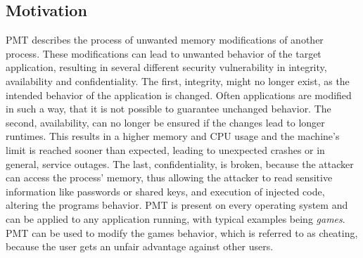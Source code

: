 \subsection{Motivation}
\gls{PMT} describes the process of unwanted memory modifications of another process. These modifications can lead to unwanted behavior of the target application, resulting in several different security vulnerability in integrity, availability and confidentiality. The first, integrity, might no longer exist, as the intended behavior of the application is changed. Often applications are modified in such a way, that it is not possible to guarantee unchanged behavior. The second, availability, can no longer be ensured if the changes lead to longer runtimes. This results in a higher memory and CPU usage and the machine's limit is reached sooner than expected, leading to unexpected crashes or in general, service outages. The last, confidentiality, is broken, because the attacker can access the process' memory, thus allowing the attacker to read sensitive information like passwords or shared keys, and execution of injected code, altering the programs behavior. \gls{PMT} is present on every operating system and can be applied to any application running, with typical examples being \emph{games}. \gls{PMT} can be used to modify the games behavior, which is referred to as cheating, because the user gets an unfair advantage against other users.